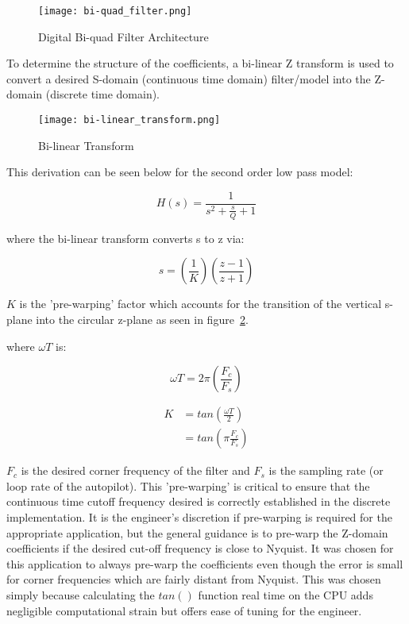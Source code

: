 \begin{figure}[h!]
 \centering
  \texttt{[image: bi-quad\_filter.png]}
  \caption{Digital Bi-quad Filter Architecture }
  \label{fig:bi-quad}
\end{figure}

To determine the structure of the coefficients, a bi-linear Z transform is used to convert a desired S-domain (continuous time domain) filter/model into the Z-domain (discrete time domain).  

\begin{figure}[h!]
 \centering
  \texttt{[image: bi-linear\_transform.png]}
  \caption{Bi-linear Transform}
  \label{fig:bi-linear_transform}
\end{figure}

This derivation can be seen below for the second order low pass model:

\begin{equation}
	H(s) = \frac{1}{s^2+\frac{s}{Q}+1}
\end{equation}

where the bi-linear transform converts s to z via:

\begin{equation}
	s = \left(\frac{1}{K}\right)\left(\frac{z-1}{z+1}\right)
\end{equation}

$K$ is the 'pre-warping' factor which accounts for the transition of the vertical s-plane into the circular z-plane as seen in figure~\ref{fig:bi-linear_transform}.

where $\omega T$ is:

\begin{equation}
	\omega T = 2\pi\left(\frac{F_c}{F_s}\right)
\end{equation}

\begin{equation}
\begin{split}
	K &= tan\left(\frac{\omega T}{2}\right) \\
	&= tan\left(\pi\frac{F_c}{F_s}\right)
\end{split}
\end{equation}



$F_c$ is the desired corner frequency of the filter and $F_s$ is the sampling rate (or loop rate of the autopilot).
This 'pre-warping' is critical to ensure that the continuous time cutoff frequency desired is correctly established in the discrete implementation.  It is the engineer's discretion if pre-warping is required for the appropriate application, but the general guidance is to pre-warp the Z-domain coefficients if the desired cut-off frequency is close to Nyquist.  It was chosen for this application to always pre-warp the coefficients even though the error is small for corner frequencies which are fairly distant from Nyquist.  This was chosen simply because calculating the $tan()$ function real time on the CPU adds negligible computational strain but offers ease of tuning for the engineer.

